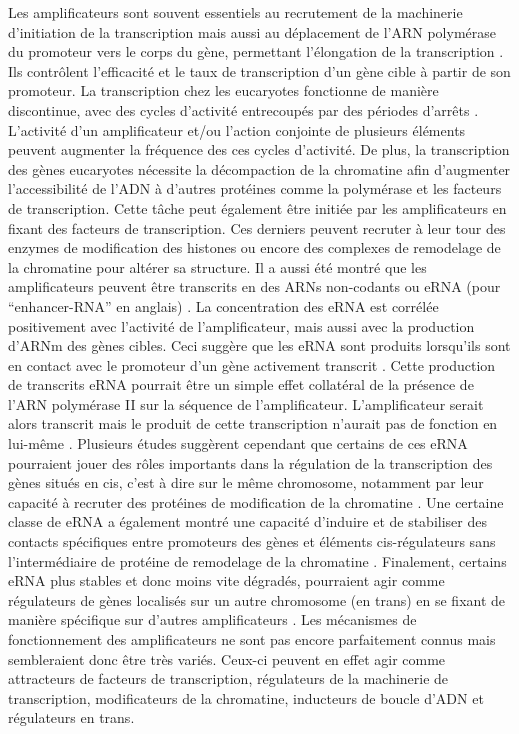 Les \glspl{amplificateur} sont souvent essentiels au recrutement de la machinerie d’initiation de la transcription mais aussi au déplacement de l’ARN polymérase du promoteur vers le corps du gène, permettant l’élongation de la transcription \citep{zippo_histone_2009}. Ils contrôlent l’efficacité et le taux de transcription d’un gène cible à partir de son promoteur. La transcription chez les eucaryotes fonctionne de manière discontinue, avec des cycles d’activité entrecoupés par des périodes d’arrêts \citep{chubb_transcriptional_2006, raj_stochastic_2006}. L’activité d’un \gls{amplificateur} et/ou l’action conjointe de plusieurs éléments peuvent augmenter la fréquence des ces cycles d’activité. De plus, la transcription des gènes eucaryotes nécessite la décompaction de la chromatine afin d’augmenter l’accessibilité de l’ADN à d’autres protéines comme la polymérase et les facteurs de transcription. Cette tâche peut également être initiée par les \glspl{amplificateur} en fixant des facteurs de transcription. Ces derniers peuvent recruter à leur tour des enzymes de modification des histones ou encore des complexes de remodelage de la chromatine pour altérer sa structure. Il a aussi été montré que les \glspl{amplificateur} peuvent être transcrits en des \acrshort{ARN}s non-codants ou \acrshort{eRNA} (pour “enhancer-RNA” en anglais) \citep{santa_large_2010}. La concentration des \acrshort{eRNA} est corrélée positivement avec l’activité de l’\gls{amplificateur}, mais aussi avec la production d’\acrshort{ARNm} des gènes cibles. Ceci suggère que les \acrshort{eRNA} sont produits lorsqu’ils sont en contact avec le promoteur d’un gène activement transcrit \citep{cheng_genome-wide_2015}. Cette production de transcrits \acrshort{eRNA} pourrait être un simple effet collatéral de la présence de l’ARN polymérase II sur la séquence de l’\gls{amplificateur}. L’\gls{amplificateur} serait alors transcrit mais le produit de cette transcription n’aurait pas de fonction en lui-même \citep{struhl_transcriptional_2007}. Plusieurs études suggèrent cependant que certains de ces \acrshort{eRNA} pourraient jouer des rôles importants dans la régulation de la transcription des gènes situés en \gls{cis}, c'est à dire sur le même chromosome, notamment par leur capacité à recruter des protéines de modification de la chromatine \citep{wang_reprogramming_2011, arnold_diversity_2020}. Une certaine classe de \acrshort{eRNA} a également montré une capacité d’induire et de stabiliser des contacts spécifiques entre promoteurs des gènes et éléments \gls{cis}-régulateurs sans l’intermédiaire de protéine de remodelage de la chromatine \citep{wang_reprogramming_2011}. Finalement, certains \acrshort{eRNA} plus stables et donc moins vite dégradés, pourraient agir comme régulateurs de gènes localisés sur un autre chromosome (en \gls{trans}) en se fixant de manière spécifique sur d’autres \glspl{amplificateur} \citep{cajigas_evf2_2018}. Les mécanismes de fonctionnement des \glspl{amplificateur} ne sont pas encore parfaitement connus mais sembleraient donc être très variés. Ceux-ci peuvent en effet agir comme attracteurs de facteurs de transcription, régulateurs de la machinerie de transcription, modificateurs de la chromatine, inducteurs de boucle d’ADN et régulateurs en \gls{trans}.

